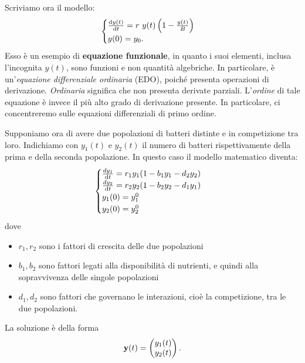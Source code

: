 Scriviamo ora il modello:
\begin{equation*}
\begin{cases}
\frac{\mathrm d y(t)}{\mathrm d t} =r\ y(t)\left( 1-\frac{y(t)}{B}\right)\\
y(0) =y_{0}.
\end{cases}
\end{equation*}
Esso è un esempio di \textbf{equazione funzionale}, in quanto i suoi elementi, inclusa l'incognita $y(t)$, sono funzioni e non quantità algebriche.
In particolare, è un'\textit{equazione differenziale ordinaria} (EDO), poiché presenta operazioni di derivazione.
\textit{Ordinaria} significa che non presenta derivate parziali.
L'\textit{ordine} di tale equazione è invece il più alto grado di derivazione presente.
In particolare, ci concentreremo sulle equazioni differenziali di primo ordine.

Supponiamo ora di avere due popolazioni di batteri distinte e in competizione tra loro. Indichiamo con $y_{1}(t)$ e $y_{2}(t)$ il numero di batteri rispettivamente della prima e della seconda popolazione. In questo caso il modello matematico diventa:
\begin{equation*}
\begin{cases}
\frac{dy_{1}}{\mathrm d t} =r_{1} y_{1}( 1-b_{1} y_{1} -d_{2} y_{2})\\
\frac{dy_{2}}{\mathrm d t} =r_{2} y_{2}( 1-b_{2} y_{2} -d_{1} y_{1})\\
y_{1}(0) =y^{0}_{1}\\
y_{2}(0) =y^{0}_{2}
\end{cases}
\end{equation*}
dove
\begin{itemize}
\item $r_{1} ,r_{2}$ sono i fattori di crescita delle due popolazioni
\item $b_{1} ,b_{2}$ sono fattori legati alla disponibilità di nutrienti, e quindi alla sopravvivenza delle singole popolazioni
\item $d_{1} ,d_{2}$ sono fattori che governano le interazioni, cioè la competizione, tra le due popolazioni.
\end{itemize}

La soluzione è della forma
\begin{equation*}
\mathbf{y}(t) =\begin{pmatrix}
y_{1}(t)\\
y_{2}(t)
\end{pmatrix}.
\end{equation*}

